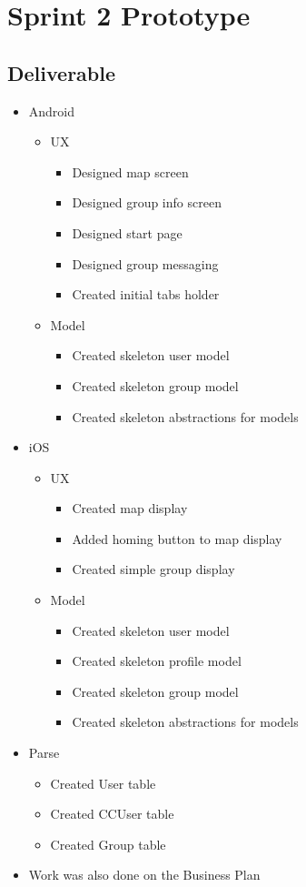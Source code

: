 \section{Sprint 2 Prototype}
\subsection{Deliverable}
\begin{itemize}
	\item Android
	\begin{itemize}
		\item UX
		\begin{itemize}
			\item Designed map screen
			\item Designed group info screen
			\item Designed start page
			\item Designed group messaging
			\item Created initial tabs holder
		\end{itemize}
		\item Model
		\begin{itemize}
			\item Created skeleton user model
			\item Created skeleton group model
			\item Created skeleton abstractions for models
		\end{itemize}
	\end{itemize}
	\item iOS
	\begin{itemize}
		\item UX
		\begin{itemize}
			\item Created map display
			\item Added homing button to map display
			\item Created simple group display
		\end{itemize}
		\item Model
		\begin{itemize}
			\item Created skeleton user model
			\item Created skeleton profile model
			\item Created skeleton group model
			\item Created skeleton abstractions for models
		\end{itemize}
	\end{itemize}
	\item Parse
	\begin{itemize}
		\item Created User table
		\item Created CCUser table
		\item Created Group table
	\end{itemize}
	\item Work was also done on the Business Plan
\end{itemize}
